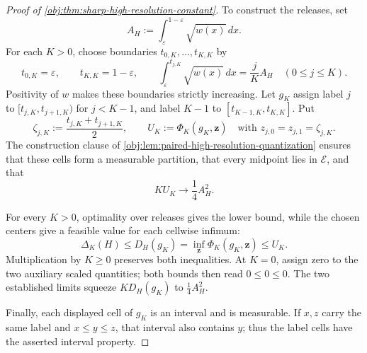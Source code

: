 \documentclass[11pt]{article}
\begin{document}
\begin{proof}[Proof of \cref{obj:thm:sharp-high-resolution-constant}]
To construct the releases, set
\[
A_H:=\int_{\varepsilon}^{1-\varepsilon}\sqrt{w(x)}\,dx.
\]
For each \(K>0\), choose boundaries \(t_{0,K},\ldots,t_{K,K}\) by
\[
t_{0,K}=\varepsilon,\qquad t_{K,K}=1-\varepsilon,\qquad
\int_{\varepsilon}^{t_{j,K}}\sqrt{w(x)}\,dx=\frac{j}{K}A_H
\quad(0\leq j\leq K).
\]
Positivity of \(w\) makes these boundaries strictly increasing. Let \(g_K\) assign label \(j\) to \([t_{j,K},t_{j+1,K})\) for \(j<K-1\), and label \(K-1\) to \([t_{K-1,K},t_{K,K}]\). Put
\[
\zeta_{j,K}:=\frac{t_{j,K}+t_{j+1,K}}2,
\qquad
U_K:=\Phi_K(g_K,\mathbf z)
\quad\text{with }z_{j,0}=z_{j,1}=\zeta_{j,K}.
\]
The construction clause of \cref{obj:lem:paired-high-resolution-quantization} ensures that these cells form a measurable partition, that every midpoint lies in \(\mathcal E\), and that
\[
K U_K\longrightarrow
\frac14 A_H^2.
\]

For every \(K>0\), optimality over releases gives the lower bound, while the chosen centers give a feasible value for each cellwise infimum:
\[
\Delta_K(H)\leq D_H(g_K)
=\inf_{\mathbf z}\Phi_K(g_K,\mathbf z)
\leq U_K.
\]
Multiplication by \(K\geq0\) preserves both inequalities. At \(K=0\), assign zero to the two auxiliary scaled quantities; both bounds then read \(0\leq0\leq0\). The two established limits squeeze \(K D_H(g_K)\) to \(\frac14A_H^2\).

Finally, each displayed cell of \(g_K\) is an interval and is measurable. If \(x,z\) carry the same label and \(x\leq y\leq z\), that interval also contains \(y\); thus the label cells have the asserted interval property.
\end{proof}
\end{document}

